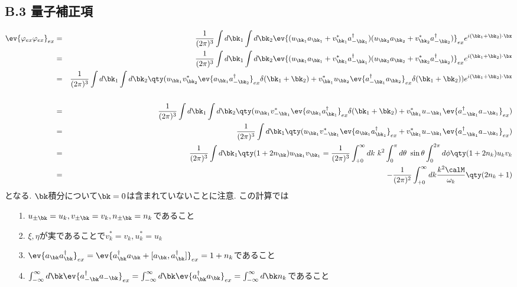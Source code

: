 \documentclass[10.5pt,a4paper]{jreport}
\begin{document}
\subsection{B.3  量子補正項}
\begin{eqnarray}
  \ev{\varphi_{ex}\varphi_{ex}}_{ex} &=& \frac{1}{(2\pi)^3}\int d\bk_1\int d\bk_2 \ev{(u_{\bk_1}a_{\bk_1} + v_{\bk_1}^* a^\dagger_{-\bk_1})(u_{\bk_2}a_{\bk_2} + v_{\bk_2}^* a^\dagger_{-\bk_2})}_{ex}e^{i(\bk_1+\bk_2)\cdot \bx}\\
  &=& \frac{1}{(2\pi)^3}\int d\bk_1\int d\bk_2 \ev{(u_{\bk_1}a_{\bk_1} + v_{\bk_1}^* a^\dagger_{-\bk_1})(u_{\bk_2}a_{\bk_2} + v_{\bk_2}^* a^\dagger_{-\bk_2})}_{ex}e^{i(\bk_1+\bk_2)\cdot \bx}\\
  \nonumber &=& \frac{1}{(2\pi)^3}\int d\bk_1\int d\bk_2 \qty(u_{\bk_1}v_{\bk_2}^*\ev{a_{\bk_1} a^\dagger_{-\bk_2}}_{ex}\delta(\bk_1 + \bk_2) + v_{\bk_1}^* u_{\bk_2} \ev{a^\dagger_{-\bk_1}a_{\bk_2}}_{ex}\delta(\bk_1 + \bk_2))e^{i(\bk_1+\bk_2)\cdot \bx}\\
  \\
  &=& \frac{1}{(2\pi)^3}\int d\bk_1\int d\bk_2 \qty(u_{\bk_1}v_{-\bk_1}^*\ev{a_{\bk_1} a^\dagger_{\bk_1}}_{ex}\delta(\bk_1 + \bk_2) + v_{\bk_1}^* u_{-\bk_1} \ev{a^\dagger_{-\bk_1}a_{-\bk_1}}_{ex})\\
  &=& \frac{1}{(2\pi)^3}\int d\bk_1 \qty(u_{\bk_1}v_{-\bk_1}^*\ev{a_{\bk_1} a^\dagger_{\bk_1}}_{ex} + v_{\bk_1}^* u_{-\bk_1} \ev{a^\dagger_{-\bk_1}a_{-\bk_1}}_{ex})\\
  &=& \frac{1}{(2\pi)^3}\int d\bk_1 \qty(1+2n_{\bk})u_{\bk_1}v_{\bk_1} = \frac{1}{(2\pi)^3}\int_{+0}^\infty dk\ k^2\int_0^\pi d\theta\ \sin{\theta}\int_0^{2\pi} d\phi \qty(1+2n_k)u_kv_k\\
  &=& -\frac{1}{(2\pi)^2}\int_{+0}^\infty dk\frac{k^2\calM}{\omega_k}\qty(2n_k + 1)
\end{eqnarray}
となる. $\bk$積分について$\bk = 0$は含まれていないことに注意. この計算では
\begin{itemize}
\item[1. ]$u_{\pm\bk} = u_k, v_{\pm\bk} = v_k, n_{\pm\bk} = n_k$であること
\item[2. ]$\xi, \eta$が実であることで$v_k^* = v_k, u_k^* = u_k$
\item[3. ]$\ev{a_{\bk}a_{\bk}^\dagger}_{ex} = \ev{a_{\bk}^\dagger a_{\bk} + [a_{\bk}, a_{\bk}^\dagger]}_{ex} = 1 + n_k$であること
\item[4. ]$\int_{-\infty}^{\infty} d\bk\ev{a^\dagger_{-\bk}a_{-\bk}}_{ex} = \int_{-\infty}^{\infty} d\bk\ev{a^\dagger_{\bk}a_{\bk}}_{ex} = \int_{-\infty}^{\infty} d\bk n_k$であること
\end{itemize}
\end{document}
